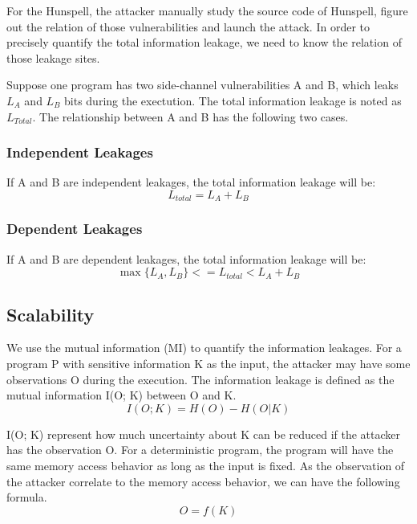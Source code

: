 For the Hunspell, the attacker manually study the source code of Hunspell, figure out
the relation of those vulnerabilities and launch the attack. In order to precisely quantify the
total information leakage, we need to know the relation of those leakage sites. 

Suppose one program has two side-channel vulnerabilities A and B, which leaks $L_A$ and $L_B$ bits
during the exectution. The total information leakage is noted as $L_{Total}$. The relationship between
A and B has the following two cases.

\subsubsection{Independent Leakages}
If A and B are independent leakages, the total information leakage will be:
\begin{equation}
\label{independent leakage}
    L_{total} = L_A + L_B
\end{equation} 

\subsubsection{Dependent Leakages}
If A and B are dependent leakages, the total information leakage will be:
\begin{equation}
\label{dependent leakage}
    \max{\{L_A, L_B\}}  <= L_{total} < L_A + L_B
\end{equation}

\subsection{Scalability}
We use the mutual information (MI) to quantify the information leakages. 
For a program P with sensitive information K as the input, the attacker may have some observations O during the execution. 
The information leakage is defined as the mutual information I(O; K) between O and K.
\begin{equation}
I(O; K) = H(O) - H(O|K)
\end{equation}

I(O; K) represent how much uncertainty about K can be reduced if the attacker has the observation O.
For a deterministic program, the program will have the same memory access behavior as long as the input is fixed. 
As the observation of the attacker correlate to the memory access behavior, 
we can have the following formula.
\begin{equation}
O = f(K)
\end{equation}

